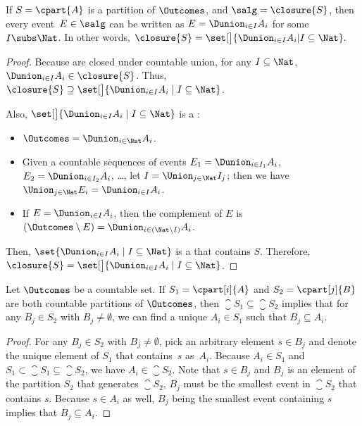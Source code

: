 \documentclass[acmsmall,nonacm,screen,appendix]{acmart}
\begin{document}
\begin{lemma}
\label{lemma:sigma-alg-representation}
  If $S = \cpart{A}$ is a partition of $\Outcomes$,
  and $\salg = \closure{S}$,
  then every event~$E\in\salg$ can be written as
  $E = \Dunion_{i \in I} A_i$ for some $I \subs \Nat$.
In other words,
  $
    \closure{S} = \set[\big]{ \Dunion_{i \in I} A_i | I \subseteq \Nat }.
  $
\end{lemma}

\begin{proof}
  Because \salgebra[s] are closed under countable union,
  for any $I \subseteq \Nat$,
  $ \Dunion_{i \in I} A_i \in \closure{S} $.
  Thus, $\closure{S} \supseteq \set[\big]{ \Dunion_{i \in I} A_i \mid I \subseteq \Nat }$.

  Also, $\set[\big]{ \Dunion_{i \in I} A_i \mid I \subseteq \Nat }$ is
  a \salgebra{}:
\begin{itemize}
    \item
      $\Outcomes = \Dunion_{i \in \Nat} A_i$.
    \item
      Given a countable sequences of events
      $E_1 = \Dunion_{i \in I_1} A_i$,
      $E_2 = \Dunion_{i \in I_2} A_i$,
      \dots,
      let
      $I = \Union_{j\in \Nat} I_j$;
      then we have
      $ \Union_{j\in\Nat} E_i = \Dunion_{i\in I} A_i $.
    \item
      If $E = \Dunion_{i \in I} A_i$, then
      the complement of $E$ is
      $
        (\Outcomes\setminus E) = \Dunion_{i \in (\Nat \setminus I)} A_i
      $.
  \end{itemize}
  Then, $\set{ \Dunion_{i \in I} A_i \mid I \subseteq \Nat }$ is
  a \salgebra{} that contains $S$.
  Therefore, $
    \closure{S} = \set[\big]{\Dunion_{i \in I} A_i \mid I \subseteq \Nat }
  $.
\end{proof}

\begin{lemma}
 \label{lemma:partition-order}
 Let $\Outcomes$ be a countable set.
 If\/ $S_1 = \cpart[i]{A}$ and
    $S_2 = \cpart[j]{B}$ are both countable partitions of $\Outcomes$,
 then $\closure{S_1} \subseteq \closure{S_2}$ implies that
 for any $B_j \in S_2$ with $B_j\ne \emptyset$,
 we can find a unique $A_i \in S_1$ such that $B_j \subseteq A_i$.
\end{lemma}

\begin{proof}
 For any $B_j \in S_2$ with $B_j\ne \emptyset$,
 pick an arbitrary element $s \in B_j$ and
 denote the unique element of $S_1$ that contains~$s$ as~$A_i$.
 Because $A_i \in S_1$ and $S_1 \subset  \closure{S_1} \subseteq \closure{S_2}$,  we have $A_i \in  \closure{S_2}$.
Note that $s \in B_j$ and $B_j$ is an element of the partition $S_2$
  that generates $\closure{S_2}$, $B_j$ must be the smallest event
  in $\closure{S_2}$ that contains $s$.
 Because $s \in A_i$ as well, $B_j$ being the smallest event containing $s$
  implies that $B_j \subseteq A_i$.
\end{proof}
\end{document}
